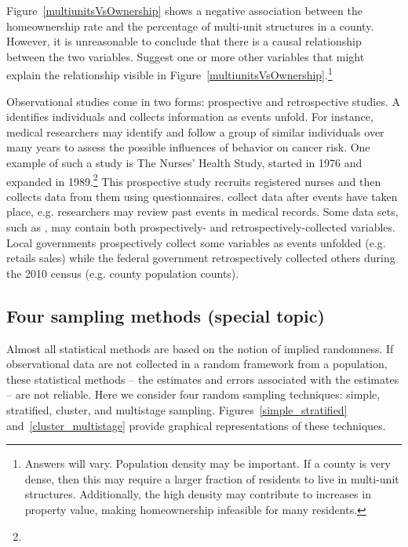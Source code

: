 \begin{exercise}
Figure~\ref{multiunitsVsOwnership} shows a negative association between the homeownership rate and the percentage of multi-unit structures in a county. However, it is unreasonable to conclude that there is a causal relationship between the two variables. Suggest one or more other variables that might explain the relationship visible in Figure~\ref{multiunitsVsOwnership}.\footnote{Answers will vary. Population density may be important. If a county is very dense, then this may require a larger fraction of residents to live in multi-unit structures. Additionally, the high density may contribute to increases in property value, making homeownership infeasible for many residents.}
\end{exercise}

Observational studies come in two forms: prospective and retrospective studies. A  identifies individuals and collects information as events unfold. For instance, medical researchers may identify and follow a group of similar individuals over many years to assess the possible influences of behavior on cancer risk. One example of such a study is The Nurses' Health Study, started in 1976 and expanded in 1989.\footnote{} This prospective study recruits registered nurses and then collects data from them using questionnaires.  collect data after events have taken place, e.g. researchers may review past events in medical records. Some data sets, such as , may contain both prospectively- and retrospectively-collected variables. Local governments prospectively collect some variables as events unfolded (e.g. retails sales) while the federal government retrospectively collected others during the 2010 census (e.g. county population counts).

\subsection{Four sampling methods (special topic)}
\label{fourSamplingMethods}
\label{threeSamplingMethods}

Almost all statistical methods are based on the notion of implied randomness. If observational data are not collected in a random framework from a population, these statistical methods -- the estimates and errors associated with the estimates -- are not reliable. Here we consider four random sampling techniques: simple, stratified, cluster, and multistage sampling. Figures~\ref{simple_stratified} and~\ref{cluster_multistage} provide graphical representations of these techniques.

